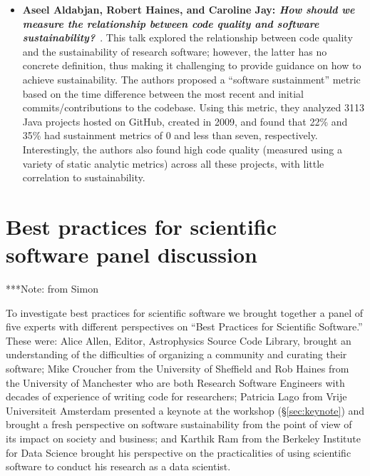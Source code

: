 \documentclass[11pt, oneside]{amsart}
\newcommand{\note}[1]{ {\textcolor{blueish}    { ***Note:      #1 }}}
\begin{document}
\begin{itemize}[itemsep=1ex]
    \item \textbf{Aseel Aldabjan, Robert Haines, and
    Caroline Jay\textsuperscript{\textasteriskcentered}: \textit{How should we
    measure the relationship between code quality and software
    sustainability?}}~\cite{Aldabjan:2016ws}.
    This talk explored the relationship between code quality and the sustainability
    of research software; however, the latter has no concrete definition, thus making
    it challenging to provide guidance on how to achieve sustainability. The authors
    proposed a ``software sustainment'' metric based on the time difference between
    the most recent and initial commits\slash contributions to the codebase.
    Using this metric, they analyzed 3113 Java projects hosted on GitHub, created
    in 2009, and found that 22\% and 35\% had sustainment metrics of 0 and less
    than seven, respectively. Interestingly, the authors also found high
    code quality (measured using a variety of static analytic metrics) across
    all these projects, with little correlation to sustainability.


\end{itemize}

\section{Best practices for scientific software panel discussion} \label{sec:panel}

\note{from Simon}

To investigate best practices for scientific software we brought together a panel of five experts with different perspectives on ``Best Practices for Scientific Software.''
These were: Alice Allen, Editor, Astrophysics Source Code Library, brought an understanding of the difficulties of organizing a community and curating their software;
Mike Croucher from the University of Sheffield and Rob Haines from the University of Manchester who are both Research Software Engineers with decades of experience of writing code for researchers;
Patricia Lago from Vrije Universiteit Amsterdam presented a keynote at the workshop (\S\ref{sec:keynote}) and brought a fresh perspective on software sustainability from the point of view of its impact on society and business; and
Karthik Ram from the Berkeley Institute for Data Science brought his perspective on the practicalities of using scientific software to conduct his research as a data scientist.
\end{document}
